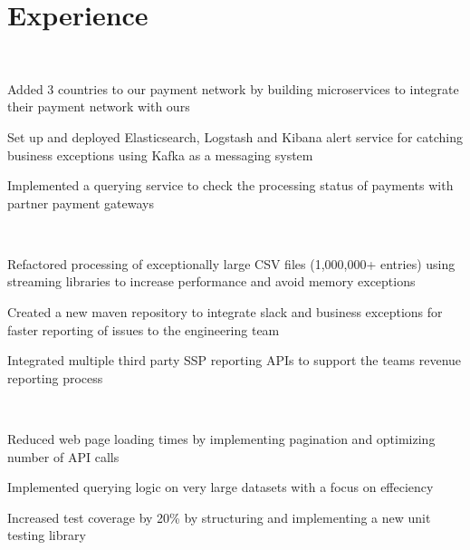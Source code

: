 \documentclass[]{hieudo-build}
\begin{document}
\begin{minipage}[t]{0.65\textwidth} 

\section{Experience}

\\
\color{myyellow}
\vspace{0.9em} %
\begin{tightemize}
\item Added 3 countries to our payment network by building microservices to integrate their payment network with ours
\item Set up and deployed Elasticsearch, Logstash and Kibana alert service for catching business exceptions using Kafka as a messaging system
\item Implemented a querying service to check the processing status of payments with partner payment gateways
\end{tightemize}
\sectionsep

\\
\color{myyellow}
\vspace{0.9em} %
\begin{tightemize}
\item Refactored processing of exceptionally large CSV files (1,000,000+ entries) using streaming libraries to increase performance and avoid memory exceptions
\item Created a new maven repository to integrate slack and business exceptions for faster reporting of issues to the engineering team
\item Integrated multiple third party SSP reporting APIs to support the teams revenue reporting process
\end{tightemize}
\sectionsep

 \\
\begin{tightemize}
\item Reduced web page loading times by implementing pagination and optimizing number of API calls 
\item Implemented querying logic on very large datasets with a focus on effeciency
\item  Increased test coverage by 20\% by structuring and implementing a new unit testing library
\end{tightemize}
\sectionsep



\end{minipage}
\end{document}
